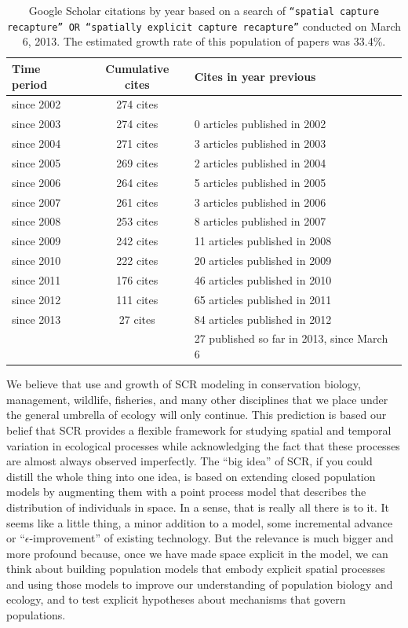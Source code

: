 \begin{table}[ht]
\caption{Google Scholar citations by year based on a search of
{\tt ``spatial capture recapture'' OR ``spatially explicit
capture recapture''} conducted on March 6, 2013. The estimated growth
rate of this population of papers was 33.4\%.
}
\begin{tabular}{lcl} \hline \hline
Time period & Cumulative cites & Cites in year previous \\ \hline
since 2002 & 274 cites & \\
since 2003 & 274 cites &0 articles published in 2002 \\
since 2004 & 271 cites &3 articles published in 2003 \\
since 2005 & 269 cites &2 articles published in 2004 \\
since 2006 & 264 cites &5 articles published in 2005 \\
since 2007 & 261 cites &3 articles published in 2006 \\
since 2008 & 253 cites &8 articles published in 2007 \\
since 2009 & 242 cites &11 articles published in 2008 \\
since 2010 & 222 cites &20 articles published in 2009 \\
since 2011 & 176 cites &46 articles published in 2010 \\
since 2012 & 111 cites &65 articles published in 2011 \\
since 2013 & 27 cites &84 articles published in 2012 \\
& &27 published so far in 2013, since March 6
\\ \hline
\end{tabular}
\label{last.tab.cites}
\end{table}

We believe that use and growth of SCR modeling in conservation
biology, management, wildlife, fisheries, and many other disciplines
that we place under the general umbrella of ecology will only
continue.  This prediction is based our belief that SCR provides a
flexible framework for studying spatial and temporal variation in
ecological processes while acknowledging the fact that these processes
are almost always observed imperfectly.  The ``big idea'' of SCR, if
you could distill the whole thing into one idea, is based on extending
closed population models by augmenting them with a point process model
that describes the distribution of individuals \citep{efford:2004} in
space.  In a sense, that is really all there is to it.  It seems like
a little thing, a minor addition to a model, some incremental advance
or ``$\epsilon$-improvement'' of existing technology.  But the
relevance is much bigger and more profound because, once we have made
space explicit in the model, we can think about building population
models that embody explicit spatial processes and using those models
to improve our understanding of population biology and ecology, and to
test explicit hypotheses about mechanisms that govern populations.

